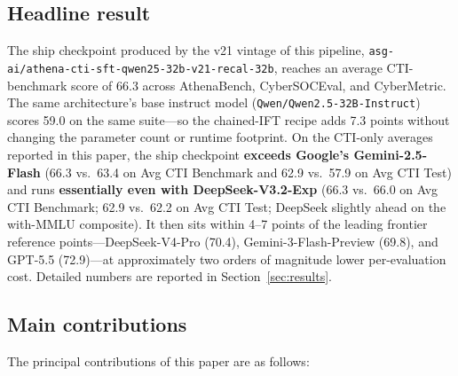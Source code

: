 \documentclass[webpdf,contemporary,large]{oup-authoring-template}
\theoremstyle{thmstyleone}
\theoremstyle{thmstyletwo}
\theoremstyle{thmstylethree}
\begin{document}
\subsection{Headline result}
\label{sec:intro-headline-result}
The ship checkpoint produced by the v21 vintage of this pipeline, \texttt{asg-ai/athena-cti-sft-qwen25-32b-v21-recal-32b}, reaches an average CTI-benchmark score of 66.3 across AthenaBench, CyberSOCEval, and CyberMetric. The same architecture's base instruct model (\texttt{Qwen/Qwen2.5-32B-Instruct}) scores 59.0 on the same suite---so the chained-IFT recipe adds 7.3 points without changing the parameter count or runtime footprint. On the CTI-only averages reported in this paper, the ship checkpoint \textbf{exceeds Google's Gemini-2.5-Flash} (66.3 vs.\ 63.4 on Avg CTI Benchmark and 62.9 vs.\ 57.9 on Avg CTI Test) and runs \textbf{essentially even with DeepSeek-V3.2-Exp} (66.3 vs.\ 66.0 on Avg CTI Benchmark; 62.9 vs.\ 62.2 on Avg CTI Test; DeepSeek slightly ahead on the with-MMLU composite). It then sits within 4--7 points of the leading frontier reference points---DeepSeek-V4-Pro (70.4), Gemini-3-Flash-Preview (69.8), and GPT-5.5 (72.9)---at approximately two orders of magnitude lower per-evaluation cost. Detailed numbers are reported in Section~\ref{sec:results}.

\subsection{Main contributions}
\label{sec:intro-main-contributions}
The principal contributions of this paper are as follows:
\end{document}
